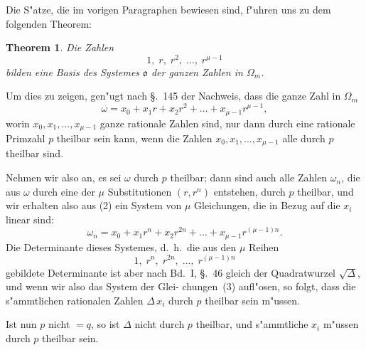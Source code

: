 \documentclass[12pt,a4paper]{article}
\theoremstyle{weber}
\newtheorem*{theorem}{Theorem}
\begin{document}
Die S"atze, die im vorigen Paragraphen bewiesen sind, f"uhren
uns zu dem folgenden Theorem:

\begin{theorem}
Die Zahlen
\begin{equation}\label{eq:s170-1}
1,\; r,\; r^2,\; \dots,\; r^{\mu-1}
\end{equation}
bilden eine Basis des Systemes $\mathfrak{o}$ der ganzen
Zahlen in $\varOmega_m$.
\end{theorem}

Um dies zu zeigen, gen"ugt nach \S.~145 der Nachweis, dass
die ganze Zahl in $\varOmega_m$
\begin{equation}\label{eq:s170-2}
\omega = x_0 + x_1r + x_2r^2 + \dots + x_{\mu-1}r^{\mu-1},
\end{equation}
worin $x_0, x_1, \dots, x_{\mu-1}$ ganze rationale Zahlen sind, nur dann
durch eine rationale Primzahl $p$ theilbar sein kann, wenn die
Zahlen $x_0, x_1, \dots, x_{\mu-1}$ alle durch $p$ theilbar sind.

Nehmen wir also an, es sei $\omega$ durch $p$ theilbar; dann sind
auch alle Zahlen $\omega_n$, die aus $\omega$ durch eine der $\mu$ Substitutionen
$(r, r^n)$ entstehen, durch $p$ theilbar, und wir erhalten also aus
(2) ein System von $\mu$ Gleichungen, die in Bezug auf die $x_i$
linear sind:
\begin{equation}\label{eq:s170-3}
\omega_n = x_0 + x_1r^n + x_2r^{2n} + \dots + x_{\mu-1}r^{(\mu-1)n}.
\end{equation}
Die Determinante dieses Systemes, d.~h.\ die aus den $\mu$ Reihen
\[
1,\; r^n,\; r^{2n},\; \dots,\; r^{(\mu-1)n}
\]
gebildete Determinante ist aber nach Bd.~I, \S.~46 gleich der
Quadratwurzel $\sqrt{\varDelta}$, und wenn wir also das System der Glei-
chungen~(3) aufl"osen, so folgt, dass die s"ammtlichen rationalen
Zahlen $\varDelta\,x_i$ durch $p$ theilbar sein m"ussen.

Ist nun $p$ nicht $= q$, so ist $\varDelta$ nicht durch $p$ theilbar, und
s"ammtliche $x_i$ m"ussen durch $p$ theilbar sein.
\end{document}
